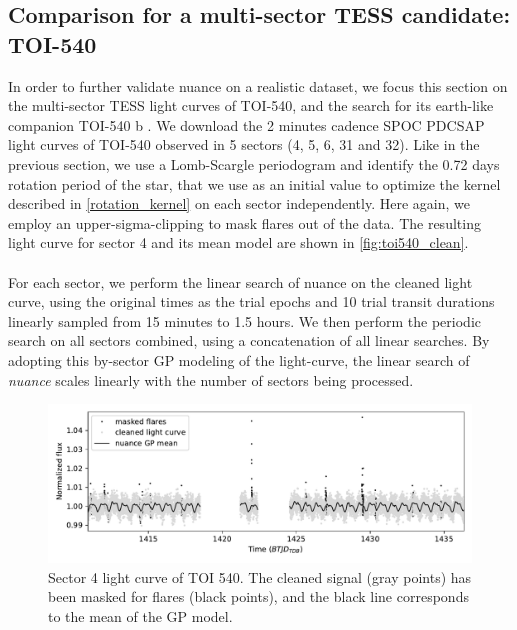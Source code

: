 \documentclass[modern]{aastex631}
\newcommand{\nuancemethod}{\textit{nuance}}
\newcommand{\nuance}{\nuancemethod{}}
\begin{document}
\subsection{Comparison for a multi-sector TESS candidate: TOI-540}\label{toi540}
In order to further validate nuance on a realistic dataset, we focus this section on the multi-sector TESS light curves of TOI-540, and the search for its earth-like companion TOI-540 b \citep{TOI540}. We download the 2 minutes cadence SPOC PDCSAP light curves of TOI-540 observed in 5 sectors (4, 5, 6, 31 and 32). Like in the previous section, we use a Lomb-Scargle periodogram and identify the 0.72 days rotation period of the star, that we use as an initial value to optimize the kernel described in \autoref{rotation_kernel} on each sector independently. Here again, we employ an upper-sigma-clipping to mask flares out of the data. The resulting light curve for sector 4 and its mean model are shown in \autoref{fig:toi540_clean}.\\\\
For each sector, we perform the linear search of nuance on the cleaned light curve, using the original times as the trial epochs and 10 trial transit durations linearly sampled from 15 minutes to 1.5 hours. We then perform the periodic search on all sectors combined, using a concatenation of all linear searches. By adopting this by-sector GP modeling of the light-curve, the linear search of \nuance{} scales linearly with the number of sectors being processed.
\begin{figure}[H]
    \begin{centering}
        \includegraphics[width=\linewidth]{../workflows/comparison_toi/figures/TOI 540/4.pdf}
        \caption{Sector 4 light curve of TOI 540. The cleaned signal (gray points) has been masked for flares (black points), and the black line corresponds to the mean of the GP model.}
        \label{fig:toi540_clean}
    \end{centering}
\end{figure}
\end{document}

